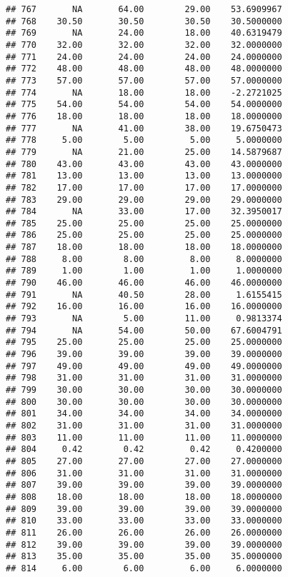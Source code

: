 \documentclass[
]{article}
\begin{document}
\begin{verbatim}
## 767       NA       64.00        29.00    53.6909967
## 768    30.50       30.50        30.50    30.5000000
## 769       NA       24.00        18.00    40.6319479
## 770    32.00       32.00        32.00    32.0000000
## 771    24.00       24.00        24.00    24.0000000
## 772    48.00       48.00        48.00    48.0000000
## 773    57.00       57.00        57.00    57.0000000
## 774       NA       18.00        18.00    -2.2721025
## 775    54.00       54.00        54.00    54.0000000
## 776    18.00       18.00        18.00    18.0000000
## 777       NA       41.00        38.00    19.6750473
## 778     5.00        5.00         5.00     5.0000000
## 779       NA       21.00        25.00    14.5879687
## 780    43.00       43.00        43.00    43.0000000
## 781    13.00       13.00        13.00    13.0000000
## 782    17.00       17.00        17.00    17.0000000
## 783    29.00       29.00        29.00    29.0000000
## 784       NA       33.00        17.00    32.3950017
## 785    25.00       25.00        25.00    25.0000000
## 786    25.00       25.00        25.00    25.0000000
## 787    18.00       18.00        18.00    18.0000000
## 788     8.00        8.00         8.00     8.0000000
## 789     1.00        1.00         1.00     1.0000000
## 790    46.00       46.00        46.00    46.0000000
## 791       NA       40.50        28.00     1.6155415
## 792    16.00       16.00        16.00    16.0000000
## 793       NA        5.00        11.00     0.9813374
## 794       NA       54.00        50.00    67.6004791
## 795    25.00       25.00        25.00    25.0000000
## 796    39.00       39.00        39.00    39.0000000
## 797    49.00       49.00        49.00    49.0000000
## 798    31.00       31.00        31.00    31.0000000
## 799    30.00       30.00        30.00    30.0000000
## 800    30.00       30.00        30.00    30.0000000
## 801    34.00       34.00        34.00    34.0000000
## 802    31.00       31.00        31.00    31.0000000
## 803    11.00       11.00        11.00    11.0000000
## 804     0.42        0.42         0.42     0.4200000
## 805    27.00       27.00        27.00    27.0000000
## 806    31.00       31.00        31.00    31.0000000
## 807    39.00       39.00        39.00    39.0000000
## 808    18.00       18.00        18.00    18.0000000
## 809    39.00       39.00        39.00    39.0000000
## 810    33.00       33.00        33.00    33.0000000
## 811    26.00       26.00        26.00    26.0000000
## 812    39.00       39.00        39.00    39.0000000
## 813    35.00       35.00        35.00    35.0000000
## 814     6.00        6.00         6.00     6.0000000

\end{verbatim}
\end{document}
